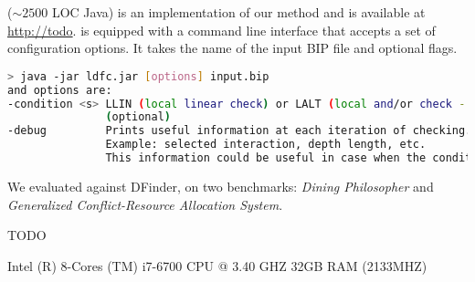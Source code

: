 %
\deadlocktool{} ($\sim 2500$ LOC Java) is an implementation of our method and is available at 
\href{http://todo}{http://todo}. 
%
\deadlocktool{} is equipped with a command line interface that accepts a set 
of configuration options. 
It takes the name of the input BIP file and optional flags. 
\begin{lstlisting}[language=Bash]
> java -jar ldfc.jar [options] input.bip 
and options are:
-condition <s> LLIN (local linear check) or LALT (local and/or check - default)
               (optional)
-debug         Prints useful information at each iteration of checking. 
               Example: selected interaction, depth length, etc.
               This information could be useful in case when the condition fails.
\end{lstlisting}

We evaluated \deadlocktool{} against DFinder, on two benchmarks: {\em Dining Philosopher} and {\em Generalized Conflict-Resource Allocation System}.

TODO

Intel (R) 8-Cores (TM) i7-6700 CPU @ 3.40 GHZ  32GB RAM (2133MHZ)